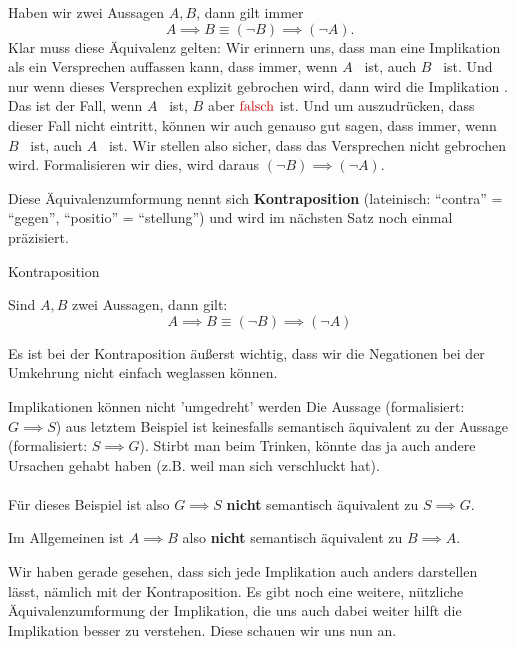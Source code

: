 \documentclass[../../main.tex]{subfiles}
\begin{document}
    Haben wir zwei Aussagen $A,B$, dann 
    gilt immer \[A \implies B \equiv (\lnot B) \implies (\lnot A).\] Klar muss 
    diese Äquivalenz gelten:  Wir erinnern uns, dass man eine Implikation als ein 
    Versprechen auffassen kann, dass immer, wenn $A$ \wahr\ ist, auch $B$ \wahr\ ist. Und nur wenn dieses Versprechen explizit gebrochen wird,
     dann wird die Implikation \falsch. Das ist der Fall, wenn $A$ \wahr\ ist, $B$ 
     aber $\falsch$ ist. Und um auszudrücken, dass dieser Fall nicht eintritt, können wir 
     auch genauso gut sagen, dass immer, wenn $B$ \falsch\  ist, auch $A$ \falsch\  ist. Wir 
     stellen also sicher, dass das Versprechen nicht gebrochen wird. Formalisieren wir dies, 
     wird daraus $(\lnot B) \implies (\lnot A)$.

    Diese Äquivalenzumformung nennt sich \textbf{Kontraposition} (lateinisch: \enquote{contra} = \enquote{gegen}, \enquote{positio} = \enquote{stellung})
    und wird im nächsten Satz noch einmal präzisiert.
    
    \begin{theorem}{Kontraposition}

    Sind $A,B$ zwei Aussagen, dann gilt:
        \[A \implies B  \equiv (\lnot B) \implies (\lnot A)\]
    \end{theorem}

    Es ist bei der Kontraposition äußerst wichtig, dass wir die Negationen bei der Umkehrung
    nicht einfach weglassen können. 

    \begin{example}{Implikationen können nicht 'umgedreht' werden}
        Die Aussage  (formalisiert: $G \implies S$) aus letztem Beispiel ist 
        keinesfalls semantisch äquivalent zu der 
        Aussage  (formalisiert: $S \implies G$).
        Stirbt man beim Trinken, könnte das ja auch andere Ursachen gehabt haben (z.B. weil man sich verschluckt hat).
        \\ \\
        Für dieses Beispiel ist also $G \implies S$ \textbf{nicht} semantisch äquivalent zu $S \implies G$.

    \end{example}

    Im Allgemeinen ist $A \implies B$ also \textbf{nicht} semantisch äquivalent zu $B \implies A$.

    Wir haben gerade gesehen, dass sich jede Implikation auch anders darstellen lässt, 
    nämlich mit der Kontraposition. Es gibt noch eine weitere, nützliche Äquivalenzumformung 
    der Implikation, die uns auch dabei weiter hilft die Implikation besser zu verstehen.
    Diese schauen wir uns nun an.
    
\end{document}
